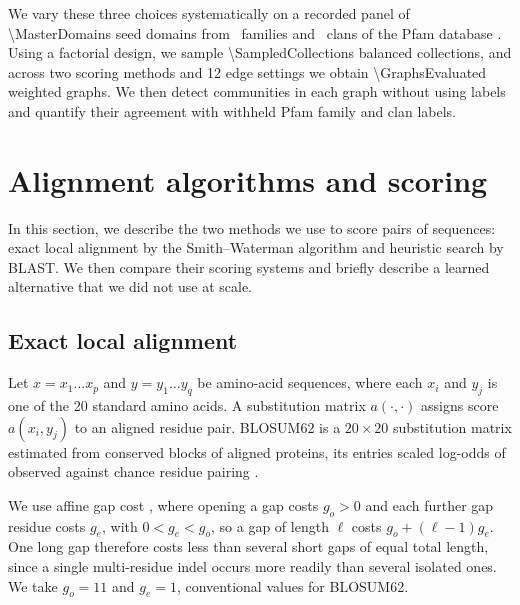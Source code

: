 \documentclass[11pt,a4paper]{article}
\begin{document}
We vary these three choices systematically on a recorded panel of
\num{\MasterDomains} seed domains from \MasterFamilies\ families and
\MasterClans\ clans of the Pfam database \citep{mistry2021pfam}. Using a
factorial design, we sample \num{\SampledCollections} balanced collections, and
across two scoring methods and 12 edge settings we obtain
\num{\GraphsEvaluated} weighted graphs. We then detect communities in each graph
without using labels and quantify their agreement with withheld Pfam family and
clan labels.

\section{Alignment algorithms and scoring}
\label{sec:alignment_algo}

In this section, we describe the two methods we use to score pairs of
sequences: exact local alignment by the Smith--Waterman algorithm and heuristic
search by BLAST. We then compare their scoring systems and briefly describe a
learned alternative that we did not use at scale.

\subsection{Exact local alignment}
\label{ssec:exact}

Let \(x=x_1\ldots x_p\) and \(y=y_1\ldots y_q\) be amino-acid sequences,
where each \(x_i\) and \(y_j\) is one of the 20 standard amino acids.
A substitution matrix \(a(\cdot,\cdot)\) assigns score \(a(x_i,y_j)\) to an
aligned residue pair. BLOSUM62 is a \(20\times20\) substitution matrix
estimated from conserved blocks of aligned proteins, its entries scaled
log-odds of observed against chance residue pairing
\citep{henikoff1992amino}.

We use affine gap cost \citep{gotoh1982improved}, where opening a gap costs
\(g_o>0\) and each further gap residue costs \(g_e\), with \(0<g_e<g_o\), so a
gap of length \(\ell\) costs \(g_o+(\ell-1)g_e\). One long gap therefore costs
less than several short gaps of equal total length, since a single
multi-residue indel occurs more readily than several isolated ones. We take
\(g_o=11\) and \(g_e=1\), conventional values for BLOSUM62.
\end{document}
